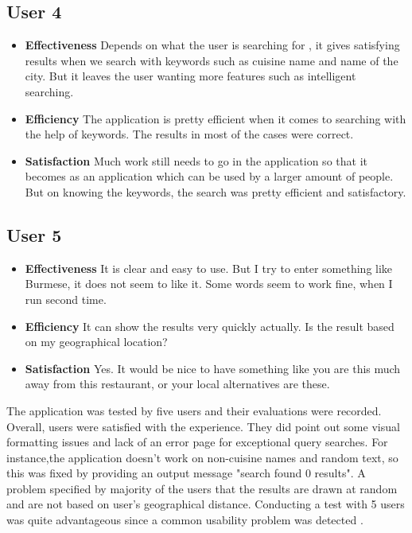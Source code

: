 \subsection{User 4}

\begin{itemize}
\item \textbf{Effectiveness} Depends on what the user is searching for , it gives satisfying results when we search with keywords such as cuisine name and  name of the city. But it leaves the user wanting more features such as intelligent searching.

\item \textbf{Efficiency} The application is pretty efficient when it comes to searching with the help of keywords. The results in most of the cases were correct.

\item \textbf{Satisfaction} Much work still needs to go in the application so that it becomes as an application which can be used by a larger amount of people. But on knowing the keywords, the search was pretty efficient and satisfactory.
\end{itemize}

\subsection{User 5}

\begin{itemize}
\item \textbf{Effectiveness} It is clear and easy to use. But I try to enter something like Burmese, it does not seem to like it. Some words seem to work fine, when I run second time.

\item \textbf{Efficiency} It can show the results very quickly actually. Is the result based
on my geographical location?

\item \textbf{Satisfaction} Yes. It would be nice to have something like you are this much away
from this restaurant, or your local alternatives are these.
\end{itemize}

The application was tested by five users and their evaluations were recorded. Overall, users were satisfied with the experience. They did point out some visual formatting issues and lack of an error page for exceptional query searches. For instance,the application doesn't work on non-cuisine names and random text, so this was fixed by providing an output message "search found 0 results". A problem specified by majority of the users that the results are drawn at random and are not based on user's geographical distance. Conducting a test with 5 users was quite advantageous since a common usability problem was detected \cite{27}.